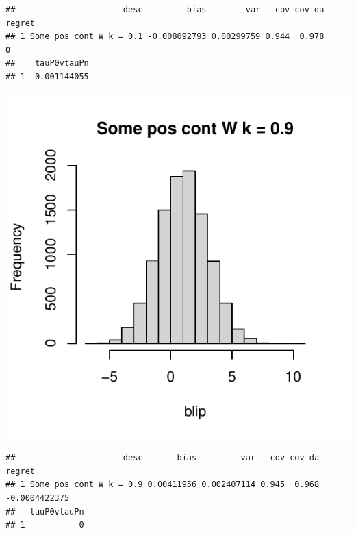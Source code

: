 \documentclass[11pt]{article}\usepackage[]{graphicx}\usepackage[table]{xcolor}
\makeatletter
\def\maxwidth{ %
  \ifdim\Gin@nat@width>\linewidth
    \linewidth
  \else
    \Gin@nat@width
  \fi
}
\newenvironment{kframe}{%
 \def\at@end@of@kframe{}%
 \ifinner\ifhmode%
  \def\at@end@of@kframe{\end{minipage}}%
  \begin{minipage}{\columnwidth}%
 \fi\fi%
 \def\FrameCommand##1{\hskip\@totalleftmargin \hskip-\fboxsep
 \colorbox{shadecolor}{##1}\hskip-\fboxsep
     \hskip-\linewidth \hskip-\@totalleftmargin \hskip\columnwidth}%
 \MakeFramed {\advance\hsize-\width
   \@totalleftmargin\z@ \linewidth\hsize
   \@setminipage}}%
 {\par\unskip\endMakeFramed%
 \at@end@of@kframe}
\newenvironment{knitrout}{}{} %
\makeatother
\begin{document}
\begin{knitrout}
\begin{kframe}\begin{verbatim}
##                      desc         bias        var   cov cov_da regret
## 1 Some pos cont W k = 0.1 -0.008092793 0.00299759 0.944  0.978      0
##    tauP0vtauPn
## 1 -0.001144055
\end{verbatim}
\end{kframe}
\includegraphics[width=\maxwidth]{figure/unnamed-chunk-4-10} 
\begin{kframe}\begin{verbatim}
##                      desc       bias         var   cov cov_da        regret
## 1 Some pos cont W k = 0.9 0.00411956 0.002407114 0.945  0.968 -0.0004422375
##   tauP0vtauPn
## 1           0
\end{verbatim}
\end{kframe}

\end{knitrout}
\end{document}
